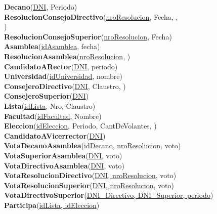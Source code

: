 \noindent \textbf{Decano}(\underline{DNI}, Periodo) \\
\textbf{ResolucionConsejoDirectivo}(\underline{nroResolucion}, Fecha, , \\)\\
\textbf{ResolucionConsejoSuperior}(\underline{nroResolucion}, Fecha)\\
\textbf{Asamblea}(\underline{idAsamblea}, fecha)\\
\textbf{ResolucionAsamblea}(\underline{nroResolucion}, )\\
\textbf{CandidatoARector}(\underline{DNI}, periodo)\\
\textbf{Universidad}(\underline{idUniversidad}, nombre)\\
\textbf{ConsejeroDirectivo}(\underline{DNI}, Claustro, )\\
\textbf{ConsejeroSuperior}(\underline{DNI})\\
\textbf{Lista}(\underline{idLista}, Nro, Claustro)\\
\textbf{Facultad}(\underline{idFacultad}, Nombre)\\
\textbf{Eleccion}(\underline{idEleccion}, Periodo, CantDeVolantes, )\\
\textbf{CandidatoAVicerrector}(\underline{DNI})\\
\textbf{VotaDecanoAsamblea}(\underline{idDecano, nroResolucion}, voto)\\
\textbf{VotaSuperiorAsamblea}(\underline{DNI}, voto)\\
\textbf{VotaDirectivoAsamblea}(\underline{DNI}, voto)\\
\textbf{VotaResolucionDirectivo}(\underline{DNI, nroResolucion}, voto)\\
\textbf{VotaResolucionSuperior}(\underline{DNI, nroResolucion}, voto)\\
\textbf{VotaDirectivoSuperior}(\underline{DNI\_Directivo, DNI\_Superior, periodo})\\
\textbf{Participa}(\underline{idLista, idEleccion})\\

